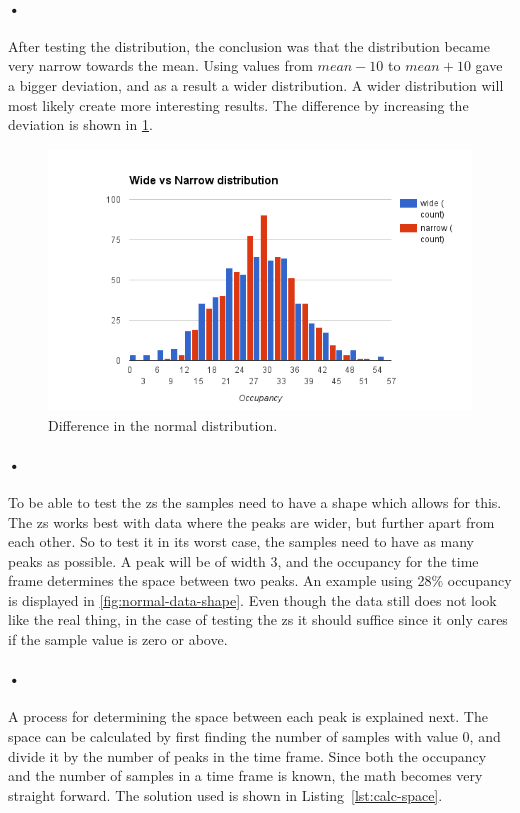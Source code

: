 \documentclass[a4paper, 12pt]{report}
\begin{document}
\paragraph{•}
After testing the distribution, the conclusion was that the distribution became very narrow towards the mean.
Using values from $mean-10$ to $mean+10$ gave a bigger deviation, and as a result a wider distribution.
A wider distribution will most likely create more interesting results.
The difference by increasing the deviation is shown in \ref{fig:distribution}.

\begin{figure}[h!]
	\centering
		\includegraphics[width=1.0\textwidth]{images/normal-dist-diff.png}
		\caption{Difference in the normal distribution.}
		\label{fig:distribution}
\end{figure}

\paragraph{•}
To be able to test the \gls{zs} the samples need to have a shape which allows for this.
The \gls{zs} works best with data where the peaks are wider, but further apart from each other.
So to test it in its worst case, the samples need to have as many peaks as possible.
A peak will be of width 3, and the occupancy for the time frame determines the space between two peaks.
An example using 28\% occupancy is displayed in \ref{fig:normal-data-shape}.
Even though the data still does not look like the real thing, in the case of testing the \gls{zs} it should suffice since it only cares if the sample value is zero or above.

\paragraph{•}
A process for determining the space between each peak is explained next.
The space can be calculated by first finding the number of samples with value 0, and divide it by the number of peaks in the time frame.
Since both the occupancy and the number of samples in a time frame is known, the math becomes very straight forward.
The solution used is shown in Listing~\ref{lst:calc-space}.
\end{document}
